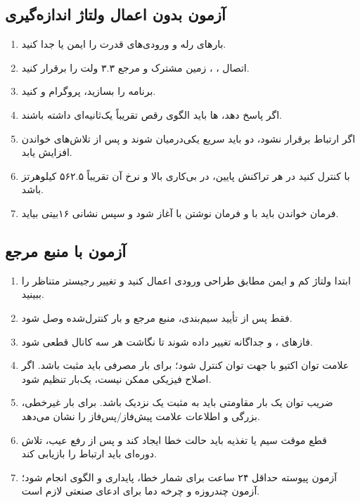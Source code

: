 \subsection{آزمون بدون اعمال ولتاژ اندازه‌گیری}
\begin{enumerate}
  \item بارهای رله و ورودی‌های قدرت را ایمن یا جدا کنید.
  \item اتصال ، ، زمین مشترک و مرجع ۳.۳ ولت  را برقرار کنید.
  \item برنامه را بسازید، پروگرام و  کنید.
  \item اگر  پاسخ دهد، ها باید الگوی رقص تقریباً یک‌ثانیه‌ای داشته باشند.
  \item اگر ارتباط برقرار نشود، دو  باید سریع یکی‌درمیان شوند و  پس از تلاش‌های خواندن افزایش یابد.
  \item با  کنترل کنید  در هر تراکنش پایین،  در بی‌کاری بالا و نرخ آن تقریباً ۵۶۲.۵ کیلوهرتز باشد.
  \item فرمان خواندن باید با  و فرمان نوشتن با  آغاز شود و سپس نشانی ۱۶بیتی  بیاید.
\end{enumerate}

\subsection{آزمون با منبع مرجع}
\begin{enumerate}
  \item ابتدا ولتاژ کم و ایمن مطابق طراحی ورودی اعمال کنید و تغییر رجیستر متناظر را ببینید.
  \item فقط پس از تأیید سیم‌بندی، منبع  مرجع و بار کنترل‌شده وصل شود.
  \item فازهای ،  و  جداگانه تغییر داده شوند تا نگاشت هر سه کانال قطعی شود.
  \item علامت توان اکتیو با جهت توان کنترل شود؛ برای بار مصرفی باید مثبت باشد. اگر اصلاح فیزیکی ممکن نیست،  یک‌بار تنظیم شود.
  \item ضریب توان یک بار مقاومتی باید به مثبت یک نزدیک باشد. برای بار غیرخطی،  بزرگی و  اطلاعات علامت پیش‌فاز/پس‌فاز را نشان می‌دهد.
  \item قطع موقت سیم  یا تغذیه  باید حالت خطا ایجاد کند و پس از رفع عیب، تلاش دوره‌ای باید ارتباط را بازیابی کند.
  \item آزمون پیوسته حداقل ۲۴ ساعت برای شمار خطا، پایداری  و الگوی  انجام شود؛ آزمون چندروزه و چرخه دما برای ادعای صنعتی لازم است.
\end{enumerate}

